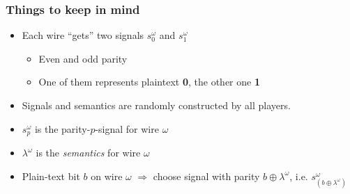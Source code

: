 \documentclass{beamer}
\begin{document}
\begin{frame}
  \frametitle{Things to keep in mind}
  \begin{itemize}
  \item Each wire ``gets'' two signals $s_0^\omega$ and $s_1^\omega$
    \begin{itemize}
    \item Even and odd parity
    \item One of them represents plaintext \textbf{0}, the other one \textbf{1}
    \end{itemize}
  \item Signals and semantics are randomly constructed by all players.
  \item<alert@2> $s_p^\omega$ is the parity-$p$-signal for wire $\omega$
  \item<alert@2> $\lambda^\omega$ is the \emph{semantics} for wire $\omega$
  \item<alert@2> Plain-text bit $b$ on wire $\omega$ $\Rightarrow$ choose signal with parity $b\oplus\lambda^\omega$, i.e. $s^\omega_{(b\oplus\lambda^\omega)}$
  \end{itemize}
\end{frame}
\end{document}
